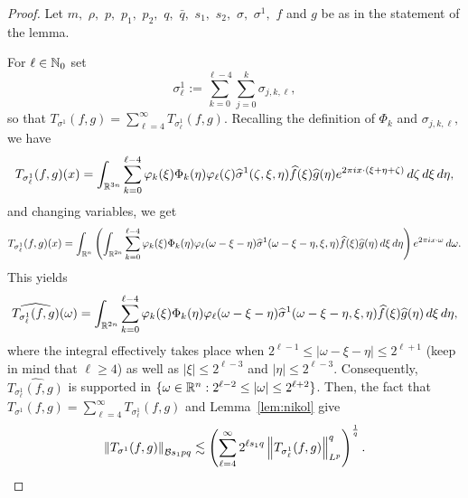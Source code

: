 \begin{proof}  Let $m,$ $\rho,$ $p,$ $p_1,$ $p_2,$ $q,$ $\bar{q},$ $s_1,$  $s_2,$ $\sigma,$ $\sigma^1,$ $f$ and $g$ be as in the statement of the lemma. 

For $\ell \in \mathbb{N}_0$  set
$$
\sigma^1_\ell:=  \sum\limits_{k=0}^{\ell -4} \sum\limits_{j =0}^{k} \sigma_{j,k,\ell},
$$
so that $T_{\sigma^1}(f,g)= \sum\limits_{\ell=4}^\infty T_{\sigma^1_\ell}(f,g)$. Recalling the definition of $\Phi_k$ and $\sigma_{j,k,\ell},$ we have
\begin{align*}
T_{\sigma^1_\ell}(f,g)(x)= \int_{\mathbb{R}^{3n}} \sum\limits_{k=0}^{\ell -4}   \varphi_k(\xi) \Phi_k(\eta)  \varphi_\ell(\zeta) \widehat{\sigma}^1(\zeta, \xi, \eta) \widehat{f}(\xi) \widehat{g}(\eta) e^{2\pi i x \cdot (\xi + \eta + \zeta)}  \, d\zeta \, d\xi \, d\eta,
\end{align*}
and changing variables, we get
\begin{align*}
T_{\sigma^1_\ell}(f,g)(x)= \int_{{{\mathbb R}^n}} \left( \int_{\mathbb{R}^{2n}}  \sum\limits_{k=0}^{\ell -4}   \varphi_k(\xi) \Phi_k(\eta)  \varphi_\ell(\omega- \xi - \eta) \widehat{\sigma}^1(\omega- \xi - \eta, \xi, \eta) \widehat{f}(\xi) \widehat{g}(\eta) \, d\xi \, d\eta \right)  e^{2\pi i x \cdot \omega} \, d\omega.
\end{align*}
This yields
\begin{align*}
\widehat{T_{\sigma^1_\ell}(f,g)}(\omega)=  \int_{\mathbb{R}^{2n}}  \sum\limits_{k=0}^{\ell -4}   \varphi_k(\xi) \Phi_k(\eta)  \varphi_\ell(\omega- \xi - \eta) \widehat{\sigma}^1(\omega- \xi - \eta, \xi, \eta) \widehat{f}(\xi) \widehat{g}(\eta) \, d\xi \, d\eta,
\end{align*}
where the integral effectively takes place when $ 2^{\ell-1}\le |\omega- \xi - \eta| \leq 2^{\ell +1}$ (keep in mind that $\ell\ge 4$)  as well as $|\xi| \leq 2^{\ell-3}$ and $|\eta| \leq 2^{\ell-3}.$  Consequently,
$\widehat{T_{\sigma^1_\ell}(f,g)}$ is supported in $\{\omega\in{{\mathbb R}^n}: 2^{\ell-2}\le |\omega| \leq 2^{\ell +2}\}$. Then, the fact that  $T_{\sigma^1}(f,g)= \sum\limits_{\ell=4}^\infty T_{\sigma^1_\ell}(f,g)$  and  Lemma~\ref{lem:nikol} give
\begin{equation}\label{eq:T:sigma:1:fg}
\left\|T_{\sigma^1}(f,g)\right\|_{\mathcal{B}{s_1}{p}{q}} \lesssim  \left( \sum\limits_{\ell=4}^\infty 2^{\ell s_1q} \left\|T_{\sigma^1_\ell}(f,g)\right\|_{{L^p}}^q \right)^\frac{1}{q}.
\end{equation}


\end{proof}
